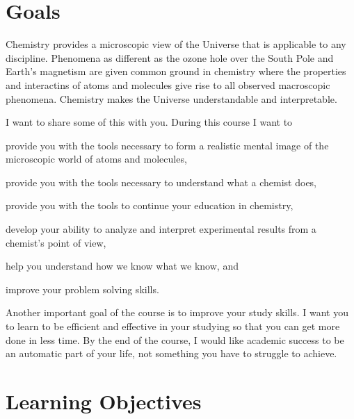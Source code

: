 \documentclass[letterpaper,oneside,onecolumn,11pt,article]{memoir}
\begin{document}

\section{Goals}

Chemistry provides a microscopic view of the Universe that is applicable to any discipline. Phenomena as different as the ozone hole over the South Pole and Earth's magnetism are given common ground in chemistry where the properties and interactins of atoms and molecules give rise to all observed macroscopic phenomena. Chemistry makes the Universe understandable and interpretable. 

I want to share some of this with you. During this course I want to 
\begin{inparaenum}
\item provide you with the tools necessary to form a realistic mental image of the microscopic world of atoms and molecules,
\item provide you with the tools necessary to understand what a chemist does,
\item provide you with the tools to continue your education in chemistry,
\item develop your ability to analyze and interpret experimental results from a chemist's point of view,
\item help you understand how we know what we know, and
\item improve your problem solving skills.
\end{inparaenum}

Another important goal of the course is to improve your study skills. I want you to learn to be efficient and effective in your studying so that you can get more done in less time. By the end of the course, I would like academic success to be an automatic part of your life, not something you have to struggle to achieve. 


\section{Learning Objectives}
\end{document}
